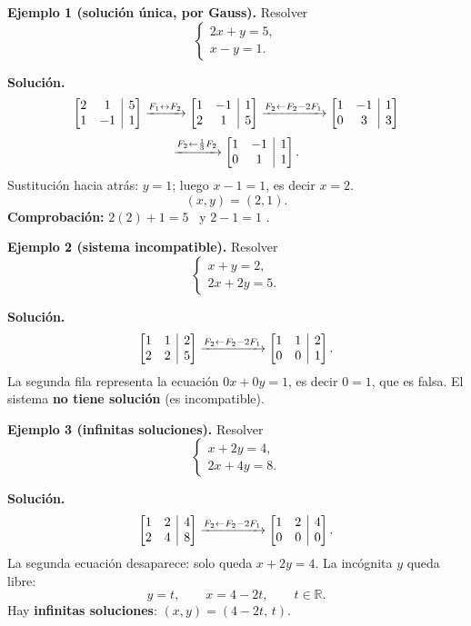 \documentclass[12pt, letterpaper]{article}
\makeatletter
\newcommand{\mwaug}[2]{\ensuremath{\left[\begin{array}{@{}#1@{}}#2\end{array}\right]}}
\makeatother
\begin{document}
\begin{cuadrosolucion}
  \small
  \textbf{Ejemplo 1 (solución única, por Gauss).} Resolver
  \[
    \begin{cases}
      2x+y=5,\\
      x-y=1.
    \end{cases}
  \]

  \medskip
  \textbf{Solución.}
  \[
    \mwaug{cc|c}{2&1&5\\1&-1&1}
    \xrightarrow{F_1\leftrightarrow F_2}
    \mwaug{cc|c}{1&-1&1\\2&1&5}
    \xrightarrow{F_2\leftarrow F_2-2F_1}
    \mwaug{cc|c}{1&-1&1\\0&3&3}
  \]
  \[
    \xrightarrow{F_2\leftarrow \frac13F_2}
    \mwaug{cc|c}{1&-1&1\\0&1&1}.
  \]
  Sustitución hacia atrás: $y=1$; luego $x-1=1$, es decir $x=2$.
  \[
    (x,y)=(2,1).
  \]
  \textbf{Comprobación:} $2(2)+1=5$ \checkmark\ y $2-1=1$ \checkmark.
\end{cuadrosolucion}

\begin{cuadrosolucion}
  \small
  \textbf{Ejemplo 2 (sistema incompatible).} Resolver
  \[
    \begin{cases}
      x+y=2,\\
      2x+2y=5.
    \end{cases}
  \]

  \medskip
  \textbf{Solución.}
  \[
    \mwaug{cc|c}{1&1&2\\2&2&5}
    \xrightarrow{F_2\leftarrow F_2-2F_1}
    \mwaug{cc|c}{1&1&2\\0&0&1}.
  \]
  La segunda fila representa la ecuación $0x+0y=1$, es decir $0=1$, que es
  falsa. El sistema \textbf{no tiene solución} (es incompatible).
\end{cuadrosolucion}

\begin{cuadrosolucion}
  \small
  \textbf{Ejemplo 3 (infinitas soluciones).} Resolver
  \[
    \begin{cases}
      x+2y=4,\\
      2x+4y=8.
    \end{cases}
  \]

  \medskip
  \textbf{Solución.}
  \[
    \mwaug{cc|c}{1&2&4\\2&4&8}
    \xrightarrow{F_2\leftarrow F_2-2F_1}
    \mwaug{cc|c}{1&2&4\\0&0&0}.
  \]
  La segunda ecuación desaparece: solo queda $x+2y=4$. La incógnita $y$
  queda libre:
  \[
    y=t,\qquad x=4-2t,\qquad t\in\mathbb{R}.
  \]
  Hay \textbf{infinitas soluciones}: $(x,y)=(4-2t,\,t)$.
\end{cuadrosolucion}
\end{document}
